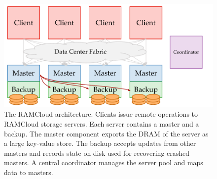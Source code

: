 \begin{figure}[t]
\centering
\includegraphics[width=0.8\columnwidth]{figures/ramcloud-cluster.pdf}
\caption{The RAMCloud architecture. Clients issue remote operations
  to RAMCloud storage servers. Each
  server contains a master and a backup. The master component exports the DRAM of
  the server as a large key-value store. The backup accepts updates from other
  masters and records state on disk used for recovering crashed masters. A
  central coordinator manages the server pool and maps data to masters.}
\label{fig:ramcloud-cluster}
\end{figure}
